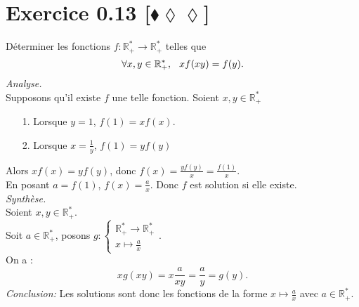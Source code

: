 \documentclass[10pt]{article}
\begin{document}
\section*{Exercice 0.13 [$\blacklozenge\lozenge\lozenge$]}
\begin{tcolorbox}[enhanced, width=6in, center, size=fbox, fontupper=\large, drop shadow southwest]
    Déterminer les fonctions $f: \mathbb{R}_+^* \rightarrow \mathbb{R}_+^*$ telles que 
    \begin{equation*}
        \forall{x,y\in\mathbb{R}^*_+}, \hspace{0.25cm} xf(xy) = f(y).
    \end{equation*}
    \emph{Analyse.}\\
    Supposons qu'il existe $f$ une telle fonction. Soient $x,y\in\mathbb{R}^*_+$
    \begin{itemize}
        \item[1.] Lorsque $y=1$, $f(1)=xf(x)$.
        \item[2.] Lorsque $x=\frac{1}{y}$, $f(1)=yf(y)$
    \end{itemize}
    Alors $xf(x)=yf(y)$, donc $f(x)=\frac{yf(y)}{x}=\frac{f(1)}{x}$.\\
    En posant $a=f(1)$, $f(x)=\frac{a}{x}$.
    Donc $f$ est solution si elle existe.\\[0.2cm]
    \emph{Synthèse.}\\
    Soient $x,y\in\mathbb{R}^*_+$.\\
    Soit $a\in\mathbb{R^*_+}$, posons $g:\begin{cases}\mathbb{R}^*_+\rightarrow\mathbb{R}^*_+\\x\mapsto\frac{a}{x}\end{cases}$.\\
    On a :
    \begin{equation*}
        xg(xy)=x\frac{a}{xy}=\frac{a}{y}=g(y).
    \end{equation*}
    \emph{Conclusion:}
    Les solutions sont donc les fonctions de la forme $x\mapsto\frac{a}{x}$ avec $a\in\mathbb{R^*_+}$.
\end{tcolorbox}
\end{document}
